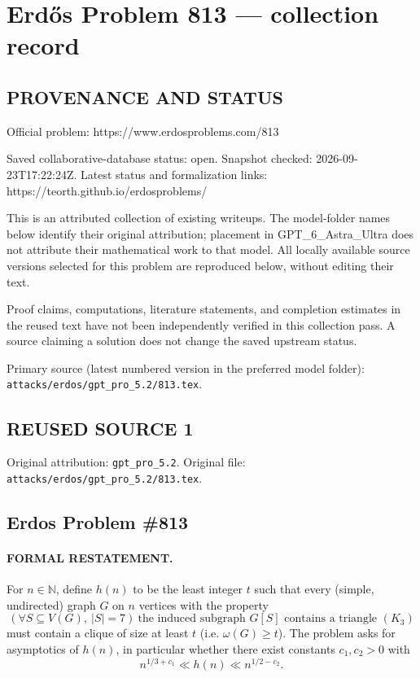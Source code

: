 \section*{Erd\H{o}s Problem 813 --- collection record}

\subsection*{PROVENANCE AND STATUS}
Official problem: https://www.erdosproblems.com/813

Saved collaborative-database status: open.
Snapshot checked: 2026-09-23T17:22:24Z.
Latest status and formalization links: https://teorth.github.io/erdosproblems/

This is an attributed collection of existing writeups. The model-folder names below identify their original attribution; placement in GPT\_6\_Astra\_Ultra does not attribute their mathematical work to that model. All locally available source versions selected for this problem are reproduced below, without editing their text.

Proof claims, computations, literature statements, and completion estimates in the reused text have not been independently verified in this collection pass. A source claiming a solution does not change the saved upstream status.

Primary source (latest numbered version in the preferred model folder): \texttt{attacks/erdos/gpt\_pro\_5.2/813.tex}.

\subsection*{REUSED SOURCE 1}
Original attribution: \texttt{gpt\_pro\_5.2}.
Original file: \texttt{attacks/erdos/gpt\_pro\_5.2/813.tex}.

\subsection*{Erdos Problem \#813}

\paragraph{FORMAL RESTATEMENT.}
For $n\in\mathbb{N}$, define $h(n)$ to be the least integer $t$ such that every (simple, undirected) graph $G$ on $n$ vertices with the property
\[
(\forall S\subseteq V(G),\ |S|=7)\ \text{the induced subgraph }G[S]\text{ contains a triangle }(K_3)
\]
must contain a clique of size at least $t$ (i.e. $\omega(G)\ge t$).
The problem asks for asymptotics of $h(n)$, in particular whether there exist constants $c_1,c_2>0$ with
\[
n^{1/3+c_1} \ll h(n) \ll n^{1/2-c_2}.
\]

